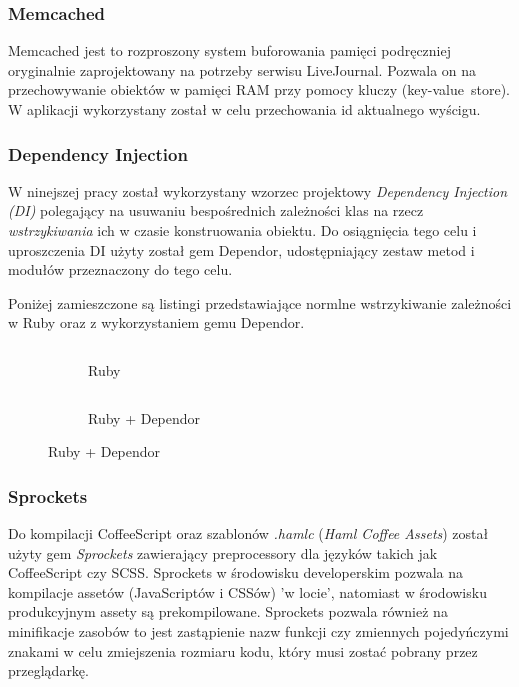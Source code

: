 \documentclass[11pt,a4paper, twoside]{article}
\begin{document}
\subsubsection{Memcached}
Memcached jest to rozproszony system buforowania pamięci podręczniej oryginalnie zaprojektowany na potrzeby serwisu  LiveJournal. Pozwala on na przechowywanie obiektów w pamięci RAM przy pomocy kluczy \mbox{(key-value store)}. W aplikacji wykorzystany został w celu przechowania id aktualnego wyścigu.
\subsubsection{Dependency Injection}
W ninejszej pracy został wykorzystany wzorzec projektowy \emph{Dependency Injection (DI)} polegający na usuwaniu bespośrednich zależności klas na rzecz \emph{wstrzykiwania} ich w czasie konstruowania obiektu. Do osiągnięcia tego celu i uproszczenia  DI użyty został gem Dependor, udostępniający zestaw metod i modułów przeznaczony do tego celu.

Poniżej zamieszczone są listingi przedstawiające normlne wstrzykiwanie zależności w Ruby oraz z wykorzystaniem gemu Dependor.
\newline


\begin{figure}[H]
\centering
\begin{subfigure}[t]{0.45\textwidth}
\caption{Ruby}
\begin{listing}[H]
\inputminted[linenos=true]{ruby}{./src/di_ruby.rb}
\end{listing}
\end{subfigure}
\begin{subfigure}[t]{0.45\textwidth}
\caption{Ruby + Dependor}
\begin{listing}[H]
\inputminted{ruby}{./src/di_dependor.rb}
\end{listing}
\end{subfigure}
\end{figure}
\subsubsection{Sprockets}
Do kompilacji CoffeeScript oraz szablonów \emph{.hamlc} (\emph{Haml Coffee Assets}) został użyty gem \emph{Sprockets} zawierający preprocessory dla języków takich jak CoffeeScript czy SCSS. Sprockets w środowisku developerskim pozwala na kompilacje assetów (JavaScriptów i CSSów) 'w locie', natomiast w środowisku produkcyjnym assety są prekompilowane. Sprockets pozwala również na minifikacje zasobów to jest zastąpienie nazw funkcji czy zmiennych pojedyńczymi znakami w celu zmiejszenia rozmiaru kodu, który musi zostać pobrany przez przeglądarkę. 
\end{document}
